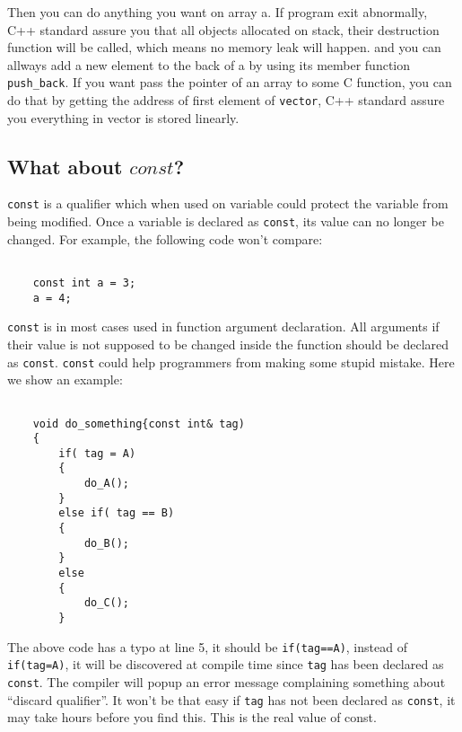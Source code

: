 \documentclass[letterpaper]{book}
\begin{document}
Then you can do anything you want on array a. If program exit abnormally, 
C++ standard assure you that all objects allocated on stack, their destruction
function will be called, which means no memory leak will happen. and you can
allways add a new element to the back of a by using its member function
\lstinline$push_back$. If you want pass the pointer of an array to some C
function, you can do that by getting the address of first element of 
\lstinline$vector$, C++ standard assure you everything in vector is stored
linearly.

\subsection{What about $const$?}

  \lstinline$const$ is a qualifier which when used on variable could protect the variable 
from being modified. Once a variable is declared as \lstinline$const$, its value 
can no longer be changed. For example, the following code won't compare:

\begin{lstlisting}

    const int a = 3;
    a = 4;
\end{lstlisting}

\lstinline$const$ is in most cases used in function argument declaration. All arguments 
if their value is not supposed to be changed inside the function should be declared as 
\lstinline$const$. \lstinline$const$ could help programmers from making some stupid mistake. 
Here we show an example:

\begin{lstlisting}

    void do_something{const int& tag)
    {
        if( tag = A)
        {
            do_A();
        }
        else if( tag == B)
        {
            do_B();
        }
        else
        {
            do_C();
        }

\end{lstlisting}

The above code has a typo at line 5, it should be \lstinline$if(tag==A)$,
instead of \lstinline$if(tag=A)$, it will be discovered at compile time
since \lstinline$tag$ has been declared as \lstinline$const$. The compiler
will popup an error message complaining something about ``discard qualifier''.
It won't be that easy if \lstinline$tag$ has not been declared as 
\lstinline$const$, it may take hours before you find this. This is the real
value of const.
\end{document}
